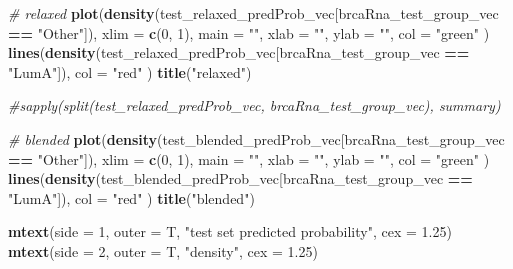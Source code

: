 \documentclass[
]{book}
\newenvironment{Shaded}{\begin{snugshade}}{\end{snugshade}}
\newcommand{\CommentTok}[1]{\textcolor[rgb]{0.56,0.35,0.01}{\textit{#1}}}
\newcommand{\DataTypeTok}[1]{\textcolor[rgb]{0.13,0.29,0.53}{#1}}
\newcommand{\DecValTok}[1]{\textcolor[rgb]{0.00,0.00,0.81}{#1}}
\newcommand{\FloatTok}[1]{\textcolor[rgb]{0.00,0.00,0.81}{#1}}
\newcommand{\KeywordTok}[1]{\textcolor[rgb]{0.13,0.29,0.53}{\textbf{#1}}}
\newcommand{\NormalTok}[1]{#1}
\newcommand{\OperatorTok}[1]{\textcolor[rgb]{0.81,0.36,0.00}{\textbf{#1}}}
\newcommand{\StringTok}[1]{\textcolor[rgb]{0.31,0.60,0.02}{#1}}
\begin{document}
\begin{Shaded}
\begin{Highlighting}[]
\CommentTok{\# relaxed}
\KeywordTok{plot}\NormalTok{(}\KeywordTok{density}\NormalTok{(test\_relaxed\_predProb\_vec[brcaRna\_test\_group\_vec }\OperatorTok{==}\StringTok{ "Other"}\NormalTok{]),}
  \DataTypeTok{xlim =} \KeywordTok{c}\NormalTok{(}\DecValTok{0}\NormalTok{, }\DecValTok{1}\NormalTok{), }\DataTypeTok{main =} \StringTok{""}\NormalTok{, }\DataTypeTok{xlab =} \StringTok{""}\NormalTok{, }\DataTypeTok{ylab =} \StringTok{""}\NormalTok{, }\DataTypeTok{col =} \StringTok{"green"}
\NormalTok{)}
\KeywordTok{lines}\NormalTok{(}\KeywordTok{density}\NormalTok{(test\_relaxed\_predProb\_vec[brcaRna\_test\_group\_vec }\OperatorTok{==}\StringTok{ "LumA"}\NormalTok{]),}
  \DataTypeTok{col =} \StringTok{"red"}
\NormalTok{)}
\KeywordTok{title}\NormalTok{(}\StringTok{"relaxed"}\NormalTok{)}

\CommentTok{\#sapply(split(test\_relaxed\_predProb\_vec, brcaRna\_test\_group\_vec), summary)}


\CommentTok{\# blended}
\KeywordTok{plot}\NormalTok{(}\KeywordTok{density}\NormalTok{(test\_blended\_predProb\_vec[brcaRna\_test\_group\_vec }\OperatorTok{==}\StringTok{ "Other"}\NormalTok{]),}
  \DataTypeTok{xlim =} \KeywordTok{c}\NormalTok{(}\DecValTok{0}\NormalTok{, }\DecValTok{1}\NormalTok{), }\DataTypeTok{main =} \StringTok{""}\NormalTok{, }\DataTypeTok{xlab =} \StringTok{""}\NormalTok{, }\DataTypeTok{ylab =} \StringTok{""}\NormalTok{, }\DataTypeTok{col =} \StringTok{"green"}
\NormalTok{)}
\KeywordTok{lines}\NormalTok{(}\KeywordTok{density}\NormalTok{(test\_blended\_predProb\_vec[brcaRna\_test\_group\_vec }\OperatorTok{==}\StringTok{ "LumA"}\NormalTok{]),}
  \DataTypeTok{col =} \StringTok{"red"}
\NormalTok{)}
\KeywordTok{title}\NormalTok{(}\StringTok{"blended"}\NormalTok{)}

\KeywordTok{mtext}\NormalTok{(}\DataTypeTok{side =} \DecValTok{1}\NormalTok{, }\DataTypeTok{outer =}\NormalTok{ T, }\StringTok{"test set predicted probability"}\NormalTok{, }\DataTypeTok{cex =} \FloatTok{1.25}\NormalTok{)}
\KeywordTok{mtext}\NormalTok{(}\DataTypeTok{side =} \DecValTok{2}\NormalTok{, }\DataTypeTok{outer =}\NormalTok{ T, }\StringTok{"density"}\NormalTok{, }\DataTypeTok{cex =} \FloatTok{1.25}\NormalTok{)}
\end{Highlighting}
\end{Shaded}
\end{document}
